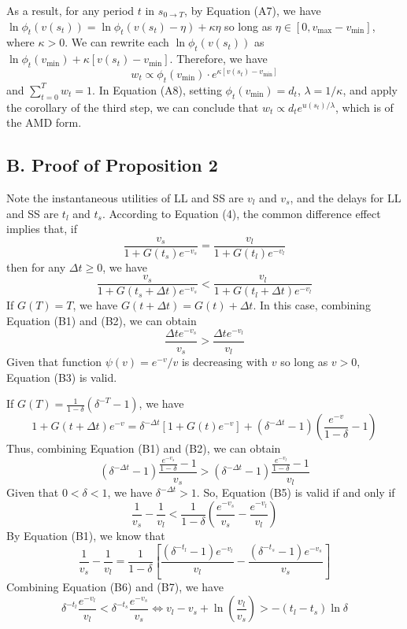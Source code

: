 As a result, for any period \(t\) in \(s_{0\rightarrow T}\), by Equation
(A7), we have \(\ln \phi_t(v(s_t))=\ln\phi_t(v(s_t)-\eta)+\kappa\eta\)
so long as \(\eta\in[0,v_{\max}-v_{\min}]\), where \(\kappa>0\). We can
rewrite each \(\ln \phi_t(v(s_t))\) as
\(\ln \phi_t(v_{\min})+\kappa[v(s_t)-v_{\min}]\). Therefore, we
have\[\tag{A8}
w_t \propto \phi_t(v_{\min})\cdot e^{\kappa[v(s_t)-v_{\min}]}
\]and \(\sum_{t=0}^T w_t=1\). In Equation (A8), setting
\(\phi_t(v_{\min})=d_t\), \(\lambda = 1/\kappa\), and apply the
corollary of the third step, we can conclude that
\(w_t\propto d_t e^{u(s_t)/\lambda}\), which is of the AMD form.

\hypertarget{b.-proof-of-proposition-2}{%
\subsection*{B. Proof of Proposition
2}\label{b.-proof-of-proposition-2}}

Note the instantaneous utilities of LL and SS are \(v_l\) and \(v_s\),
and the delays for LL and SS are \(t_l\) and \(t_s\). According to
Equation (4), the common difference effect implies that, if\[ \tag{B1}
\frac{v_s}{1+G(t_s)e^{-v_s}} = \frac{v_l}{1+G(t_l)e^{-v_l}}
\]then for any \(\Delta t \geq 0\), we have \[ \tag{B2}
\frac{v_s}{1+G(t_s+\Delta t)e^{-v_s}} < \frac{v_l}{1+G(t_l+\Delta t)e^{-v_l}}
\]If \(G(T)=T\), we have \(G(t+\Delta t) = G(t) + \Delta t\). In this
case, combining Equation (B1) and (B2), we can obtain\[ \tag{B3}
\frac{\Delta t e^{-v_s}}{v_s} > \frac{\Delta t e^{-v_l}}{v_l}
\]Given that function \(\psi(v) = e^{-v}/v\) is decreasing with \(v\) so
long as \(v>0\), Equation (B3) is valid.

If \(G(T) = \frac{1}{1-\delta}(\delta^{-T}-1)\), we have\[\tag{B4}
1+G(t+\Delta t)e^{-v} = \delta^{-\Delta t}[1+G(t)e^{-v}]+(\delta^{-\Delta t}-1)(\frac{e^{-v}}{1-\delta}-1)
\] Thus, combining Equation (B1) and (B2), we can obtain\[\tag{B5}
(\delta^{-\Delta t}-1)\frac{\frac{e^{-v_s}}{1-\delta}-1}{v_s} >
(\delta^{-\Delta t}-1)\frac{\frac{e^{-v_l}}{1-\delta}-1}{v_l}
\] Given that \(0<\delta<1\), we have \(\delta^{-\Delta t}>1\). So,
Equation (B5) is valid if and only if\[\tag{B6}
\frac{1}{v_s}-\frac{1}{v_l}<\frac{1}{1-\delta}(\frac{e^{-v_s}}{v_s}-\frac{e^{-v_l}}{v_l})
\] By Equation (B1), we know that\[\tag{B7}
\frac{1}{v_s}-\frac{1}{v_l}=\frac{1}{1-\delta}\left[\frac{(\delta^{-t_l}-1)e^{-v_l}}{v_l} -\frac{(\delta^{-t_s}-1)e^{-v_s}}{v_s}\right]
\] Combining Equation (B6) and (B7), we have\[
\delta^{-t_l}\frac{e^{-v_l}}{v_l}<\delta^{-t_s}\frac{e^{-v_s}}{v_s} \Longleftrightarrow v_l - v_s + \ln \left(\frac{v_l}{v_s}\right)>-(t_l-t_s)\ln\delta
\]

